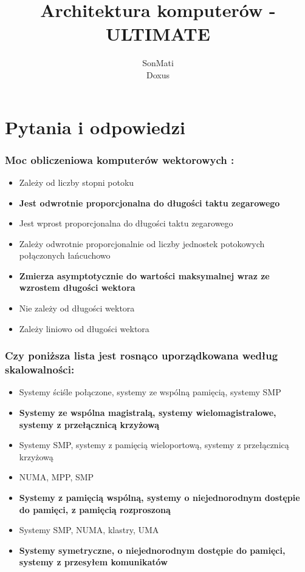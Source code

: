 \documentclass[a4paper,twoside]{article}
\begin{document}




\begin{titlepage}
\title{\huge Architektura komputerów - ULTIMATE}
\author{\large SonMati \\ Doxus}
\maketitle
\end{titlepage}

\part*{Pytania i odpowiedzi}
\section{Moc obliczeniowa komputerów wektorowych :}
	\begin{itemize}
    \item Zależy od liczby stopni potoku
    \item \textbf{Jest odwrotnie proporcjonalna do długości taktu zegarowego}
    \item Jest wprost proporcjonalna do długości taktu zegarowego
    \item Zależy odwrotnie proporcjonalnie od liczby jednostek potokowych połączonych łańcuchowo
    \item \textbf{Zmierza asymptotycznie do wartości maksymalnej wraz ze wzrostem długości wektora}
    \item Nie zależy od długości wektora
    \item Zależy liniowo od długości wektora
    \end{itemize}

\section{Czy poniższa lista jest rosnąco uporządkowana według skalowalności:}
	\begin{itemize}
    \item Systemy ściśle połączone, systemy ze wspólną pamięcią, systemy SMP
    \item \textbf{Systemy ze wspólna magistralą, systemy wielomagistralowe, systemy z przełącznicą krzyżową}
    \item Systemy SMP, systemy z pamięcią wieloportową, systemy z przełącznicą krzyżową
    \item NUMA, MPP, SMP
    \item \textbf{Systemy z pamięcią wspólną, systemy o niejednorodnym dostępie do pamięci, z pamięcią rozproszoną}
    \item Systemy SMP, NUMA, klastry, UMA
    \item \textbf{Systemy symetryczne, o niejednorodnym dostępie do pamięci, systemy z przesyłem komunikatów}
    \end{itemize}
    
\end{document}
